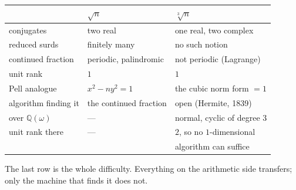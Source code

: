 \documentclass[12pt,a4paper]{article}
\theoremstyle{plain}
\theoremstyle{definition}
\begin{document}
\begin{center}
\begin{tabular}{lll}
\toprule
 & $\sqrt n$ & $\sqrt[3]{n}$ \\
\midrule
conjugates              & two real                 & one real, two complex \\
reduced surds           & finitely many            & no such notion \\
continued fraction      & periodic, palindromic    & not periodic (Lagrange) \\
unit rank               & $1$                      & $1$ \\
Pell analogue           & $x^2-ny^2=1$             & the cubic norm form $=1$ \\
algorithm finding it    & the continued fraction   & open (Hermite, 1839) \\
\midrule
over $\mathbb{Q}(\omega)$ & --- & normal, cyclic of degree $3$ \\
unit rank there         & ---                      & $2$, so no $1$-dimensional \\
                        &                          & algorithm can suffice \\
\bottomrule
\end{tabular}
\end{center}

The last row is the whole difficulty. Everything on the arithmetic side transfers; only the machine that finds it does not.
\end{document}
